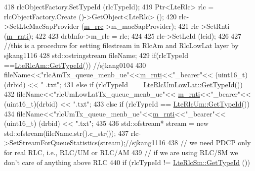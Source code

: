 \begin{DoxyCode}
418   rlcObjectFactory.SetTypeId (rlcTypeId);
419   Ptr<LteRlc> rlc = rlcObjectFactory.Create ()->GetObject<LteRlc> ();
420   rlc->SetLteMacSapProvider (\hyperlink{classns3_1_1UeManager_ab4405e9f354c66e7c1a4c95832290f5b}{m\_rrc}->m\_macSapProvider);
421   rlc->SetRnti (\hyperlink{classns3_1_1UeManager_a5a72b4fe818f21993bd7f05d7e2c4f83}{m\_rnti});
422 
423   drbInfo->m\_rlc = rlc;
424 
425   rlc->SetLcId (lcid);
426 
427   \textcolor{comment}{//this is a procedure for setting filestream in RlcAm and RlcLowLat layer  by sjkang1116}
428                                 std::ostringstream fileName;
429                                 \textcolor{keywordflow}{if}(rlcTypeId ==\hyperlink{classns3_1_1LteRlcAm_a28143176a465769583d9db0b4b36b91b}{LteRlcAm::GetTypeId}())  \textcolor{comment}{//sjkang0104}
430                      fileName<<\textcolor{stringliteral}{"rlcAmTx\_queue\_menb\_ue"}<<\hyperlink{classns3_1_1UeManager_a5a72b4fe818f21993bd7f05d7e2c4f83}{m\_rnti}<<\textcolor{stringliteral}{"\_bearer"}<< (uint16\_t)(drbid) << \textcolor{stringliteral}{"
      .txt"};
431                                 \textcolor{keywordflow}{else} \textcolor{keywordflow}{if} (rlcTypeId == \hyperlink{classns3_1_1LteRlcUmLowLat_afcbc09793556f00ce2cd62cb0c9c670b}{LteRlcUmLowLat::GetTypeId}())
432                                   fileName<<\textcolor{stringliteral}{"rlcUmLowLatTx\_queue\_menb\_ue"}<<
      \hyperlink{classns3_1_1UeManager_a5a72b4fe818f21993bd7f05d7e2c4f83}{m\_rnti}<<\textcolor{stringliteral}{"\_bearer"}<< (uint16\_t)(drbid) << \textcolor{stringliteral}{".txt"};
433                                 \textcolor{keywordflow}{else} \textcolor{keywordflow}{if} (rlcTypeId == \hyperlink{classns3_1_1LteRlcUm_a119b2b1273c42483a050896d5232829d}{LteRlcUm::GetTypeId}())
434                                     fileName<<\textcolor{stringliteral}{"rlcUmTx\_queue\_menb\_ue"}<<\hyperlink{classns3_1_1UeManager_a5a72b4fe818f21993bd7f05d7e2c4f83}{m\_rnti}<<\textcolor{stringliteral}{"\_bearer"}<< (uint16\_t)
      (drbid) << \textcolor{stringliteral}{".txt"};
435 
436                                 std::ofstream* stream = \textcolor{keyword}{new} std::ofstream(fileName.str().c\_str());
437                      rlc->SetStreamForQueueStatistics(stream);\textcolor{comment}{//sjkang1116}
438   \textcolor{comment}{// we need PDCP only for real RLC, i.e., RLC/UM or RLC/AM}
439   \textcolor{comment}{// if we are using RLC/SM we don't care of anything above RLC}
440   \textcolor{keywordflow}{if} (rlcTypeId != \hyperlink{classns3_1_1LteRlcSm_a160bd39ce4e0d113dd5d93cc3a258045}{LteRlcSm::GetTypeId} ())

\end{DoxyCode}
